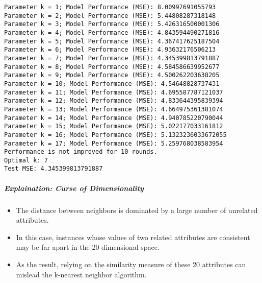 \documentclass[11pt]{article}
\providecommand{\tightlist}{%
      \setlength{\itemsep}{0pt}\setlength{\parskip}{0pt}}
\begin{document}
    \begin{Verbatim}[commandchars=\\\{\}]
Parameter k = 1; Model Performance (MSE): 8.00997691055793
Parameter k = 2; Model Performance (MSE): 5.44808287318148
Parameter k = 3; Model Performance (MSE): 5.426316500001306
Parameter k = 4; Model Performance (MSE): 4.843594490271816
Parameter k = 5; Model Performance (MSE): 4.367417625187504
Parameter k = 6; Model Performance (MSE): 4.93632176506213
Parameter k = 7; Model Performance (MSE): 4.345399813791887
Parameter k = 8; Model Performance (MSE): 4.584586639952677
Parameter k = 9; Model Performance (MSE): 4.500262203638205
Parameter k = 10; Model Performance (MSE): 4.54648828737431
Parameter k = 11; Model Performance (MSE): 4.695587787121037
Parameter k = 12; Model Performance (MSE): 4.833644395839394
Parameter k = 13; Model Performance (MSE): 4.664975361381074
Parameter k = 14; Model Performance (MSE): 4.940785220790044
Parameter k = 15; Model Performance (MSE): 5.022177033161812
Parameter k = 16; Model Performance (MSE): 5.1323236033672055
Parameter k = 17; Model Performance (MSE): 5.259768038583954
Performance is not improved for 10 rounds.
Optimal k: 7
Test MSE: 4.345399813791887
    \end{Verbatim}

    \hypertarget{explaination-curse-of-dimensionality}{%
\subparagraph{Explaination: Curse of
Dimensionality}\label{explaination-curse-of-dimensionality}}

\begin{itemize}
\tightlist
\item
  The distance between neighbors is dominated by a large number of
  unrelated attributes.
\item
  In this case, instances whose values of two related attributes are
  consistent may be far apart in the 20-dimensional space.
\item
  As the result, relying on the similarity measure of these 20
  attributes can mislead the k-nearest neighbor algorithm.
\end{itemize}
\end{document}
